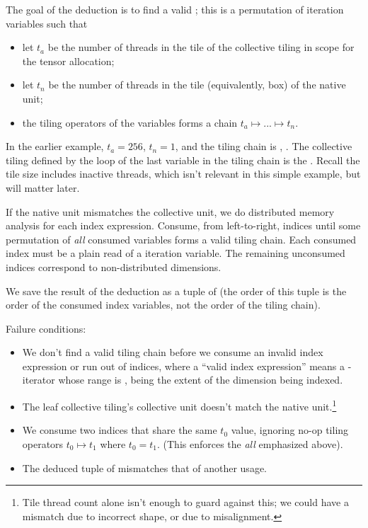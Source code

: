 \filbreak
{}

The goal of the deduction is to find a valid ; this is a permutation of  iteration variables such that
\begin{itemize}
  \item let $t_a$ be the number of threads in the tile of the collective tiling in scope for the tensor allocation;
  \item let $t_n$ be the number of threads in the tile (equivalently, box) of the native unit;
  \item the tiling operators of the variables forms a chain $t_a \mapsto ... \mapsto t_n$.
\end{itemize}

\filbreak
In the earlier example, $t_a = 256$, $t_n = 1$, and the tiling chain is , .
The collective tiling defined by the  loop of the last variable in the tiling chain is the .
Recall the tile size includes inactive threads, which isn't relevant in this simple example, but will matter later.

\filbreak
If the native unit mismatches the collective unit, we do distributed memory analysis for each index expression.
Consume, from left-to-right, indices until some permutation of \textit{all} %
consumed variables forms a valid tiling chain.
Each consumed index must be a plain read of a  iteration variable.
The remaining unconsumed indices correspond to non-distributed dimensions.

\filbreak
We save the result of the deduction as a tuple of  (the order of this tuple is the order of the consumed index variables, not the order of the tiling chain).

\filbreak
Failure conditions:
\begin{itemize}
  \item We don't find a valid tiling chain before we consume an invalid index expression or run out of indices, where a ``valid index expression'' means a -iterator whose range is \lighttt{[0, sz)},  being the extent of the dimension being indexed.
  \filbreak
  \item The leaf collective tiling's collective unit doesn't match the native unit.\footnote{Tile thread count alone isn't enough to guard against this; we could have a mismatch due to incorrect shape, or due to misalignment.}
  \filbreak
  \item We consume two indices that share the same $t_0$ value, ignoring no-op tiling operators $t_0 \mapsto t_1$ where $t_0 = t_1$. (This enforces the \textit{all} emphasized above).
  \filbreak
  \item The deduced tuple of  mismatches that of another usage.
\end{itemize}

